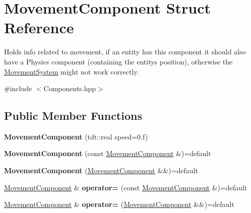 \hypertarget{struct_movement_component}{}\section{Movement\+Component Struct Reference}
\label{struct_movement_component}


Holds info related to movement, if an entity has this component it should also have a Physics component (containing the entity\textquotesingle{}s position), otherwise the \hyperlink{class_movement_system}{Movement\+System} might not work correctly.  




{\ttfamily \#include $<$Components.\+hpp$>$}

\subsection*{Public Member Functions}
\begin{DoxyCompactItemize}
\item 
{\bfseries Movement\+Component} (tdt\+::real speed=0.f)\hypertarget{struct_movement_component_add6cc4d335eacf819fc740fee0481dad}{}\label{struct_movement_component_add6cc4d335eacf819fc740fee0481dad}

\item 
{\bfseries Movement\+Component} (const \hyperlink{struct_movement_component}{Movement\+Component} \&)=default\hypertarget{struct_movement_component_a4d00d816a717fab21e939bf939b420d3}{}\label{struct_movement_component_a4d00d816a717fab21e939bf939b420d3}

\item 
{\bfseries Movement\+Component} (\hyperlink{struct_movement_component}{Movement\+Component} \&\&)=default\hypertarget{struct_movement_component_a27b68675aafa43ae2aed17a72618bd05}{}\label{struct_movement_component_a27b68675aafa43ae2aed17a72618bd05}

\item 
\hyperlink{struct_movement_component}{Movement\+Component} \& {\bfseries operator=} (const \hyperlink{struct_movement_component}{Movement\+Component} \&)=default\hypertarget{struct_movement_component_ab7d1f86d8048f4927affec173751d932}{}\label{struct_movement_component_ab7d1f86d8048f4927affec173751d932}

\item 
\hyperlink{struct_movement_component}{Movement\+Component} \& {\bfseries operator=} (\hyperlink{struct_movement_component}{Movement\+Component} \&\&)=default\hypertarget{struct_movement_component_aa5fec9c8dbd615bc3771eaf696e6a914}{}\label{struct_movement_component_aa5fec9c8dbd615bc3771eaf696e6a914}

\end{DoxyCompactItemize}
